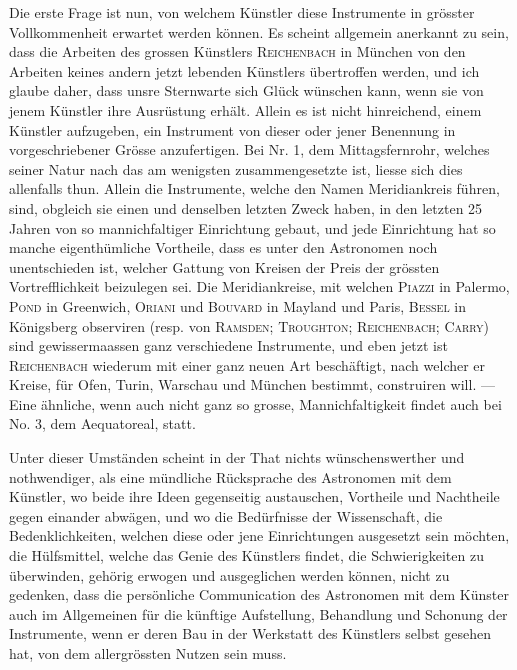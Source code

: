 Die erste Frage ist nun, von welchem Künstler diese Instrumente in grösster Vollkommenheit erwartet werden können. Es scheint allgemein anerkannt zu sein, dass die Arbeiten des grossen Künstlers \textsc{Reichenbach} in München von den Arbeiten keines andern jetzt lebenden Künstlers übertroffen werden, und ich glaube daher, dass unsre Sternwarte sich Glück wünschen kann, wenn sie von jenem Künstler ihre Ausrüstung erhält. Allein es ist nicht hinreichend, einem Künstler aufzugeben, ein Instrument von dieser oder jener Benennung in vorgeschriebener Grösse anzufertigen. Bei Nr. 1, dem Mittagsfernrohr, welches seiner Natur nach das am wenigsten zusammengesetzte ist, liesse sich dies allenfalls thun. Allein die Instrumente, welche den Namen Meridiankreis führen, sind, obgleich sie einen und denselben letzten Zweck haben, in den letzten 25 Jahren von so mannichfaltiger Einrichtung gebaut, und jede Einrichtung hat so manche eigenthümliche Vortheile, dass es unter den Astronomen noch unentschieden ist, welcher Gattung von Kreisen der Preis der grössten Vortrefflichkeit beizulegen sei. Die Meridiankreise, mit welchen \textsc{Piazzi} in Palermo, \textsc{Pond} in Greenwich, \textsc{Oriani} und \textsc{Bouvard} in Mayland und
\clearpage{}
\noindent Paris, \textsc{Bessel} in Königsberg observiren (resp. von \textsc{Ramsden}; \textsc{Troughton}; \textsc{Reichenbach}; \textsc{Carry}) sind gewissermaassen ganz verschiedene Instrumente, und eben jetzt ist \textsc{Reichenbach} wiederum mit einer ganz neuen Art beschäftigt, nach welcher er Kreise, für Ofen, Turin, Warschau und München bestimmt, construiren will. — Eine ähnliche, wenn auch nicht ganz so grosse, Mannichfaltigkeit findet auch bei No. 3, dem Aequatoreal, statt.

Unter dieser Umständen scheint in der That nichts wünschenswerther und nothwendiger, als eine mündliche Rücksprache des Astronomen mit dem Künstler, wo beide ihre Ideen gegenseitig austauschen, Vortheile und Nachtheile gegen einander abwägen, und wo die Bedürfnisse der Wissenschaft, die Bedenklichkeiten, welchen diese oder jene Einrichtungen ausgesetzt sein möchten, die Hülfsmittel, welche das Genie des Künstlers findet, die Schwierigkeiten zu überwinden, gehörig erwogen und ausgeglichen werden können, nicht zu gedenken, dass die persönliche Communication des Astronomen mit dem Künster auch im Allgemeinen für die künftige Aufstellung, Behandlung und Schonung der Instrumente, wenn er deren Bau in der Werkstatt des Künstlers selbst gesehen hat, von dem allergrössten Nutzen sein muss.

